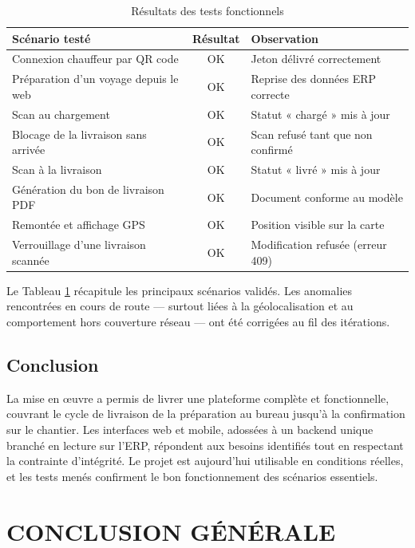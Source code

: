 \documentclass[12pt,a4paper]{report}
\begin{document}
\begin{table}[htbp]
\centering
\caption{Résultats des tests fonctionnels}
\label{tab:tests}
\begin{tabular}{|p{6.5cm}|c|p{4cm}|}
\hline
\textbf{Scénario testé} & \textbf{Résultat} & \textbf{Observation} \\
\hline
Connexion chauffeur par QR code & OK & Jeton délivré correctement \\
\hline
Préparation d'un voyage depuis le web & OK & Reprise des données ERP correcte \\
\hline
Scan au chargement & OK & Statut « chargé » mis à jour \\
\hline
Blocage de la livraison sans arrivée & OK & Scan refusé tant que non confirmé \\
\hline
Scan à la livraison & OK & Statut « livré » mis à jour \\
\hline
Génération du bon de livraison PDF & OK & Document conforme au modèle \\
\hline
Remontée et affichage GPS & OK & Position visible sur la carte \\
\hline
Verrouillage d'une livraison scannée & OK & Modification refusée (erreur 409) \\
\hline
\end{tabular}
\end{table}

Le Tableau \ref{tab:tests} récapitule les principaux scénarios validés. Les anomalies rencontrées en cours de route — surtout liées à la géolocalisation et au comportement hors couverture réseau — ont été corrigées au fil des itérations.

\section{Conclusion}

La mise en œuvre a permis de livrer une plateforme complète et fonctionnelle, couvrant le cycle de livraison de la préparation au bureau jusqu'à la confirmation sur le chantier. Les interfaces web et mobile, adossées à un backend unique branché en lecture sur l'ERP, répondent aux besoins identifiés tout en respectant la contrainte d'intégrité. Le projet est aujourd'hui utilisable en conditions réelles, et les tests menés confirment le bon fonctionnement des scénarios essentiels.

\newpage

\chapter*{CONCLUSION GÉNÉRALE}
\end{document}
